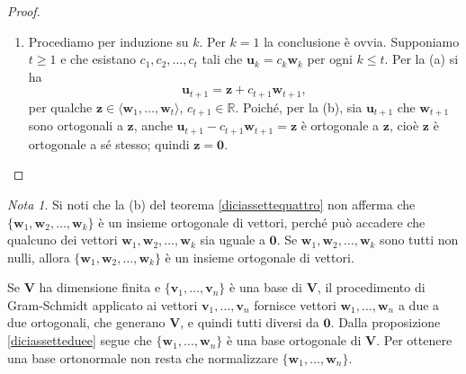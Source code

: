 \documentclass{article}
\theoremstyle{plain}
\theoremstyle{definition}
\theoremstyle{remark}
\newtheorem{note}{Nota}
\begin{document}
\begin{proof}
\begin{enumerate}
    \item Procediamo per induzione su $k$. Per $k=1$ la conclusione è ovvia. Supponiamo $t \geq 1$ e che esistano 
    $c_1, c_2, \ldots, c_t$ tali che $\mathbf{u}_k = c_k \mathbf{w}_k$ per ogni $k \leq t$. Per la (a) si ha
    \[
    \mathbf{u}_{t+1} = \mathbf{z} + c_{t+1} \mathbf{w}_{t+1},
    \]
    per qualche $\mathbf{z} \in \langle \mathbf{w}_1, \ldots, \mathbf{w}_t \rangle$, $c_{t+1} \in \mathbb{R}$. 
    Poiché, per la (b), sia $\mathbf{u}_{t+1}$ che $\mathbf{w}_{t+1}$ sono ortogonali a $\mathbf{z}$, anche 
    $\mathbf{u}_{t+1} - c_{t+1} \mathbf{w}_{t+1} = \mathbf{z}$ è ortogonale a $\mathbf{z}$, cioè $\mathbf{z}$ 
    è ortogonale a sé stesso; quindi $\mathbf{z}=\mathbf{0}$.
\end{enumerate}
\end{proof}

\vspace{10pt}

\begin{note}
Si noti che la (b) del teorema \ref{diciassettequattro} non afferma che $\{ \mathbf{w}_1, \mathbf{w}_2, \ldots, \mathbf{w}_k \}$ è un 
insieme ortogonale di vettori, perché può accadere che qualcuno dei vettori $\mathbf{w}_1, \mathbf{w}_2, \ldots, \mathbf{w}_k$ sia 
uguale a $\mathbf{0}$. Se $\mathbf{w}_1, \mathbf{w}_2, \ldots, \mathbf{w}_k$ sono tutti non nulli, allora $\{ \mathbf{w}_1, \mathbf{w}_2, \ldots, \mathbf{w}_k \}$ è un 
insieme ortogonale di vettori.    
\end{note}

\vspace{10pt}

Se $\mathbf{V}$ ha dimensione finita e $\{ \mathbf{v}_1, \ldots, \mathbf{v}_n \}$ è una base di $\mathbf{V}$, 
il procedimento di Gram-Schmidt applicato ai vettori $\mathbf{v}_1, \ldots, \mathbf{v}_n$ fornisce vettori 
$\mathbf{w}_1, \ldots, \mathbf{w}_n$ a due a due ortogonali, che generano $\mathbf{V}$, 
e quindi tutti diversi da $\mathbf{0}$. Dalla proposizione \ref{diciassetteduee} segue che 
$\{ \mathbf{w}_1, \ldots, \mathbf{w}_n \}$ è una base ortogonale di $\mathbf{V}$. Per ottenere una base ortonormale 
non resta che normalizzare $\{ \mathbf{w}_1, \ldots, \mathbf{w}_n \}$.

\vspace{10pt}
\end{document}
